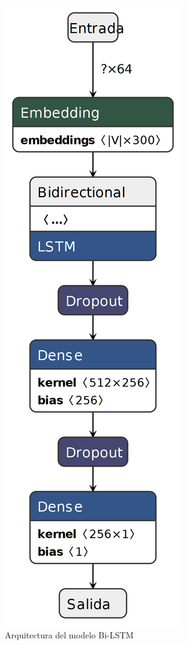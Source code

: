 \begin{figure}[!hb]
    \centering
  \includegraphics[scale=0.25]{sections/figures/lstm_model.png}
    \caption{Arquitectura del modelo Bi-LSTM}
    \label{fig:lstm_model}
\end{figure}

